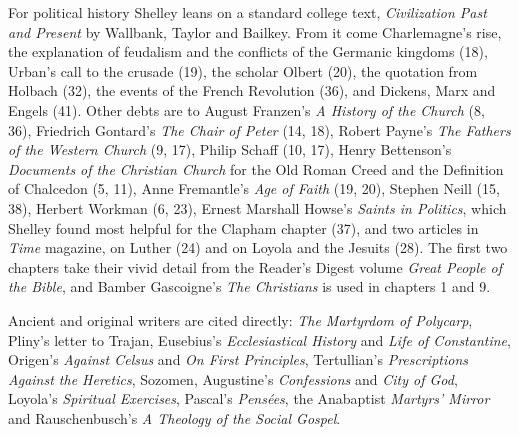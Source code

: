For political history Shelley leans on a standard college text, \emph{Civilization Past and Present}
by Wallbank, Taylor and Bailkey. From it come Charlemagne's rise, the explanation of feudalism and
the conflicts of the Germanic kingdoms (18), Urban's call to the crusade (19), the scholar Olbert
(20), the quotation from Holbach (32), the events of the French Revolution (36), and Dickens, Marx
and Engels (41). Other debts are to August Franzen's \emph{A History of the Church} (8, 36),
Friedrich Gontard's \emph{The Chair of Peter} (14, 18), Robert Payne's \emph{The Fathers of the
Western Church} (9, 17), Philip Schaff (10, 17), Henry Bettenson's \emph{Documents of the Christian
Church} for the Old Roman Creed and the Definition of Chalcedon (5, 11), Anne Fremantle's \emph{Age
of Faith} (19, 20), Stephen Neill (15, 38), Herbert Workman (6, 23), Ernest Marshall Howse's
\emph{Saints in Politics}, which Shelley found most helpful for the Clapham chapter (37), and two
articles in \emph{Time} magazine, on Luther (24) and on Loyola and the Jesuits (28). The first two
chapters take their vivid detail from the Reader's Digest volume \emph{Great People of the Bible}, and Bamber Gascoigne's \emph{The Christians} is used in chapters 1 and 9.

Ancient and original writers are cited directly: \emph{The Martyrdom of Polycarp}, Pliny's letter to
Trajan, Eusebius's \emph{Ecclesiastical History} and \emph{Life of Constantine}, Origen's
\emph{Against Celsus} and \emph{On First Principles}, Tertullian's \emph{Prescriptions Against the
Heretics}, Sozomen, Augustine's \emph{Confessions} and \emph{City of God}, Loyola's \emph{Spiritual
Exercises}, Pascal's \emph{Pens\'ees}, the Anabaptist \emph{Martyrs' Mirror} and Rauschenbusch's
\emph{A Theology of the Social Gospel}.

